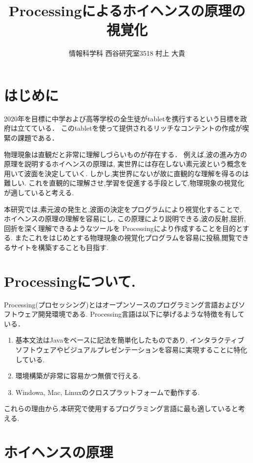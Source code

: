 \documentclass[a4j,twocolumn,uplatex]{jarticle}
\begin{document}
\title{Processingによるホイヘンスの原理の視覚化}
\author{情報科学科 西谷研究室3518 村上 大貴}
\date{}
\maketitle
\section{はじめに}

2020年を目標に中学および高等学校の全生徒がtabletを携行するという目標を政府は立てている\cite{tablet}．
このtabletを使って提供されるリッチなコンテントの作成が喫緊の課題である．

物理現象は直観だと非常に理解しづらいものが存在する．
例えば,波の進み方の原理を説明するホイヘンスの原理は,
実世界には存在しない素元波という概念を用いて波面を決定していく.
しかし,実世界にないが故に直観的な理解を得るのは難しい.
これを直観的に理解させ,学習を促進する手段として,物理現象の視覚化が適していると考える.

本研究では,素元波の発生と,波面の決定をプログラムにより視覚化することで,
ホイヘンスの原理の理解を容易にし,
この原理により説明できる,波の反射,屈折,回折を深く理解できるようなツールを
Processingにより作成することを目的とする.
またこれをはじめとする物理現象の視覚化プログラムを容易に投稿,閲覧できるサイトを構築することも目指す.

\section{Processingについて.}
Processing(プロセッシング)とはオープンソースのプログラミング言語およびソフトウェア開発環境である.
Processing言語は以下に挙げるような特徴を有している\cite{ishikawa}．
\begin{enumerate}
\item 基本文法はJavaをベースに記法を簡単化したものであり,
インタラクティブソフトウェアやビジュアルプレゼンテーションを容易に実現することに特化している.
\item 環境構築が非常に容易かつ無償で行える.
\item Windowa, Mac, Linuxのクロスプラットフォームで動作する.
\end{enumerate}
これらの理由から,本研究で使用するプログラミング言語に最も適していると考える.

\section{ホイヘンスの原理}
\end{document}
